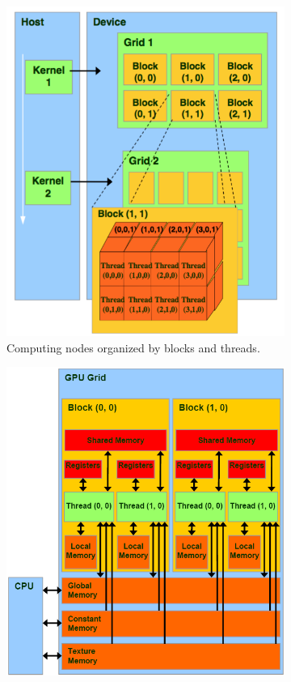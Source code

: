 \begin{figure}
 \begin{subfigure}{0.48\textwidth}
 \includegraphics[width=\linewidth]{ch4/figs/grid-of-thread-blocks.png}
 \caption{Computing nodes organized by blocks and threads.} \label{fig:GPU_basics_a}
\end{subfigure}%
\hspace*{\fill}   %
 \begin{subfigure}{0.48\textwidth}
 \includegraphics[width=\linewidth]{ch4/figs/memory-hierarchy.png}

\end{subfigure}
\end{figure}
